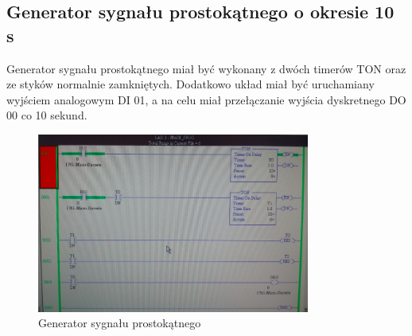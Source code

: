 \documentclass[a4paper, 12pt]{article}
\begin{document}
		\subsection{Generator sygnału prostokątnego o okresie 10 s}
			Generator sygnału prostokątnego miał być wykonany z dwóch timerów TON oraz ze styków normalnie zamkniętych. Dodatkowo układ miał być uruchamiany wyjściem analogowym DI 01, a na celu miał przełączanie wyjścia dyskretnego DO 00 co 10 sekund.
			\begin{figure}[H]
				\centering
				\includegraphics[width=0.8\textwidth]{./img/timer.png}
				\caption{Generator sygnału prostokątnego}
			\end{figure}
\end{document}
